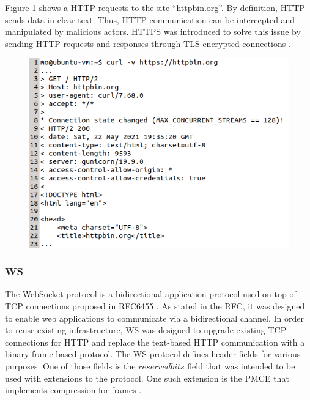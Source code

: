 Figure \ref{fig:curl-http-request-respose} shows a \ac{HTTP} requests to the site \enquote{httpbin.org}. By definition, \ac{HTTP} sends data in clear-text. Thus, \ac{HTTP} communication can be intercepted and manipulated by malicious actors. \ac{HTTPS} was introduced to solve this issue by sending \ac{HTTP} requests and responses through \ac{TLS} encrypted connections \cite{rfc2818}.

\begin{figure}[h!]
    \centering
    \includegraphics[width=12cm]{img/ch03/http-request-response.png}
    \label{fig:curl-http-request-respose}
\end{figure}

\subsubsection{\ac{WS}}
The WebSocket protocol is a bidirectional application protocol used on top of \ac{TCP} connections proposed in RFC6455 \cite{rfc6455}. As stated in the RFC, it was designed to enable web applications to communicate via a bidirectional channel. In order to reuse existing infrastructure, \ac{WS} was designed to upgrade existing \ac{TCP} connections for \ac{HTTP} and replace the text-based \ac{HTTP} communication with a binary frame-based protocol. The \ac{WS} protocol defines header fields for various purposes. One of those fields is the $reserved bits$ field that was intended to be used with extensions to the protocol. One such extension is the \ac{PMCE} that implements compression for frames \cite{rfc7692}.

